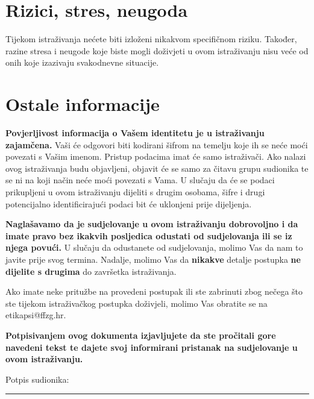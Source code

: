 \documentclass[11pt]{article}
\begin{document}
\section{Rizici, stres, neugoda}

Tijekom istraživanja nećete biti izloženi nikakvom specifičnom riziku. Također,
razine stresa i neugode koje biste mogli doživjeti u ovom istraživanju nisu veće
od onih koje izazivaju svakodnevne situacije.

\section{Ostale informacije}

\textbf{Povjerljivost informacija o Vašem identitetu je u istraživanju
zajamčena.} Vaši će odgovori biti kodirani šifrom na temelju koje ih se neće
moći povezati s Vašim imenom. Pristup podacima imat će samo istraživači. Ako
nalazi ovog istraživanja budu objavljeni, objavit će se samo za čitavu grupu
sudionika te se ni na koji način neće moći povezati s Vama. U slučaju da će se
podaci prikupljeni u ovom istraživanju dijeliti s drugim osobama, šifre i drugi
potencijalno identificirajući podaci bit će uklonjeni prije dijeljenja.

\textbf{Naglašavamo da je sudjelovanje u ovom istraživanju dobrovoljno i da
imate pravo bez ikakvih posljedica odustati od sudjelovanja ili se iz njega
povući.} U slučaju da odustanete od sudjelovanja, molimo Vas da nam to javite
prije svog termina.
Nadalje, molimo Vas da \textbf{nikakve} detalje postupka \textbf{ne dijelite s
drugima} do završetka istraživanja.

\vspace{2em}

\noindent Ako imate neke pritužbe na provedeni postupak ili ste
zabrinuti zbog nečega što ste tijekom istraživačkog postupka doživjeli, molimo
Vas obratite se na etikapsi@ffzg.hr.

\vspace{2em}

\noindent \textbf{Potpisivanjem ovog dokumenta izjavljujete da ste pročitali
    gore navedeni tekst te dajete svoj informirani pristanak na sudjelovanje u
ovom istraživanju.} 
\vspace*{5em}

\noindent Potpis sudionika: \rule{6cm}{0.15mm}
\end{document}
